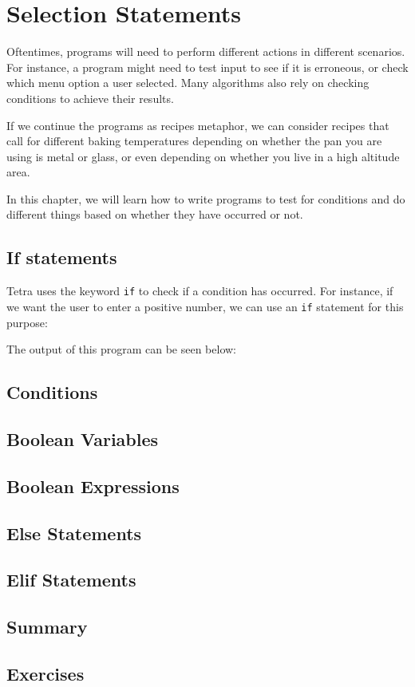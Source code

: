 \chapter{Selection Statements}

Oftentimes, programs will need to perform different actions in different
scenarios.  For instance, a program might need to test input to see if
it is erroneous, or check which menu option a user selected.  Many
algorithms also rely on checking conditions to achieve their results.

If we continue the programs as recipes metaphor, we can consider recipes
that call for different baking temperatures depending on whether the pan
you are using is metal or glass, or even depending on whether you live in
a high altitude area.

In this chapter, we will learn how to write programs to test for conditions
and do different things based on whether they have occurred or not.

\section{If statements}

Tetra uses the keyword \texttt{if} to check if a condition has occurred.
For instance, if we want the user to enter a positive number, we can use
an \texttt{if} statement for this purpose:

\def \codelabel {ch3if1}
\def \codecaption{Using if to check input}


The output of this program can be seen below:





\section{Conditions}


\section{Boolean Variables}


\section{Boolean Expressions}

\section{Else Statements}



\section{Elif Statements}


\section{Summary}


\section{Exercises}

